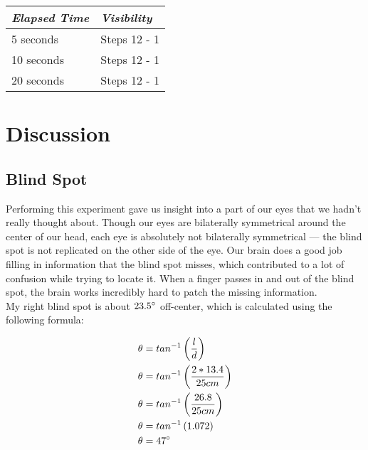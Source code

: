 \documentclass{article}
\newcommand{\parens}[1]{\left(#1\right)}
\begin{document}
\begin{table}[ht]
    \begin{tabular}{|l|l|}
    \hline
    \emph{Elapsed Time} & \emph{Visibility}   \\ \hline
    5 seconds    & Steps 12 - 1 \\ \hline
    10 seconds   & Steps 12 - 1 \\ \hline
    20 seconds   & Steps 12 - 1 \\ \hline
    \end{tabular}
\end{table}

 \lighttable

\begin{center}
\end{center}

\pagebreak

\section{Discussion}
\subsection{Blind Spot}
Performing this experiment gave us insight into a part of our eyes that we hadn't really thought about. Though our eyes are bilaterally symmetrical around the center of our head, each eye is absolutely not bilaterally symmetrical --- the blind spot is not replicated on the other side of the eye. Our brain does a good job filling in information that the blind spot misses, which contributed to a lot of confusion while trying to locate it. When a finger passes in and out of the blind spot, the brain works incredibly hard to patch the missing information. \\
My right blind spot is about $23.5\degree$ off-center, which is calculated using the following formula:
\begin{center}
\begin{align*}
\theta &= tan^{-1}\parens{\frac{l}{d}} \\
\theta &= tan^{-1}\parens{\frac{2 * 13.4}{25cm}} \\
\theta &= tan^{-1}\parens{\frac{26.8}{25cm}} \\
\theta &= tan^{-1}\parens{1.072} \\
\theta &= 47\degree
\end{align*}
\end{center}
\end{document}
